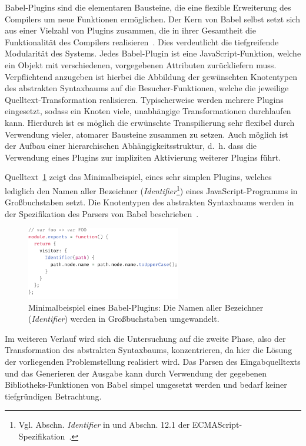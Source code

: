 Babel-Plugins sind die elementaren Bausteine, die eine flexible Erweiterung des Compilers um neue Funktionen ermöglichen. Der Kern von Babel selbst setzt sich aus einer Vielzahl von Plugins zusammen, die in ihrer Gesamtheit die Funktionalität des Compilers realisieren~\autocite{BABEL}. Dies verdeutlicht die tiefgreifende Modularität des Systems. Jedes Babel-Plugin ist eine JavaScript-Funktion, welche ein Objekt mit verschiedenen, vorgegebenen Attributen zurückliefern muss. Verpflichtend anzugeben ist hierbei die Abbildung der gewünschten Knotentypen des abstrakten Syntaxbaums auf die Besucher-Funktionen, welche die jeweilige Quelltext-Transformation realisieren. Typischerweise werden mehrere Plugins eingesetzt, sodass ein Knoten viele, unabhängige Transformationen durchlaufen kann. Hierdurch ist es möglich die erwünschte Transpilierung sehr flexibel durch Verwendung vieler, atomarer Bausteine zusammen zu setzen. Auch möglich ist der Aufbau einer hierarchischen Abhängigkeitsstruktur, d.~h. dass die Verwendung eines Plugins zur impliziten Aktivierung weiterer Plugins führt.

Quelltext~\ref{code:babel-plugin-definition} zeigt das Minimalbeispiel, eines sehr simplen Plugins, welches lediglich den Namen aller Bezeichner (\textit{Identifier}\footnote{Vgl. Abschn. \textit{Identifier} in \autocite{BABEL_PARSER_SPEC} und Abschn. 12.1 der ECMAScript-Spezifikation~\autocite[187\psqq]{ECMASCRIPT:2019}.}) eines JavaScript-Programms in Großbuchstaben setzt. Die Knotentypen des abstrakten Syntaxbaums werden in der Spezifikation des Parsers von Babel beschrieben~\autocite{BABEL_PARSER_SPEC}.


\begin{figure}[tbp]
  \includegraphics[width=0.6\textwidth]{src/2_Grundlagen/fig/minimal-babel-plugin.pdf}
  \caption[Minimalbeispiel eines Babel-Plugins]{Minimalbeispiel eines Babel-Plugins: Die Namen aller Bezeichner (\textit{Identifier}) werden in Großbuchstaben umgewandelt.}
  \label{code:babel-plugin-definition}
\end{figure}


Im weiteren Verlauf wird sich die Untersuchung auf die zweite Phase, also der Transformation des abstrakten Syntaxbaums, konzentrieren, da hier die Lösung der vorliegenden Problemstellung realisiert wird. Das Parsen des Eingabquelltexts und das Generieren der Ausgabe kann durch Verwendung der gegebenen Bibliotheks-Funktionen von Babel simpel umgesetzt werden und bedarf keiner tiefgründigen Betrachtung.
